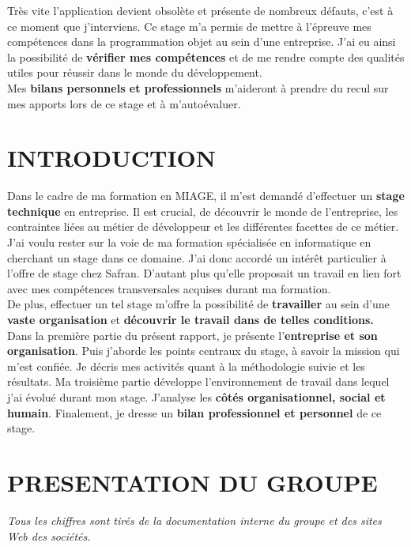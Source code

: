 Très vite l’application devient obsolète et présente de nombreux défauts, c’est à ce moment que j’interviens.
Ce stage m’a permis de mettre à l’épreuve mes compétences dans la programmation objet au sein d’une entreprise. J’ai eu ainsi la possibilité de \textbf {vérifier mes compétences} et de me rendre compte des qualités utiles pour réussir dans le monde du développement. \\

Mes \textbf {bilans personnels et professionnels} m’aideront à prendre du recul sur mes apports lors de ce stage et à m’autoévaluer.\\


\chapter{ INTRODUCTION }


	Dans le cadre de ma formation en MIAGE, il m’est demandé d’effectuer un \textbf{stage technique} en entreprise. Il est crucial, de découvrir le monde de l’entreprise, les contraintes liées au métier de développeur et les différentes facettes de ce métier. J’ai voulu rester sur la voie de ma formation spécialisée en informatique en cherchant un stage dans ce domaine. J’ai donc accordé un intérêt particulier à l’offre de stage chez Safran. D’autant plus qu’elle proposait un travail en lien fort avec mes compétences transversales acquises durant ma formation. \\
    
De plus, effectuer un tel stage m’offre la possibilité de \textbf{travailler} au sein d’une \textbf{vaste organisation} et \textbf{découvrir le travail dans de telles conditions.}\\

Dans la première partie du présent rapport, je présente l’\textbf{entreprise et son organisation}. Puis j’aborde les points centraux du stage, à savoir la mission qui m’est confiée. Je décris mes activités quant à la méthodologie suivie et les résultats. Ma troisième partie développe l’environnement de travail dans lequel j’ai évolué durant mon stage. J’analyse les \textbf{côtés organisationnel, social et humain}. Finalement, je dresse un \textbf{bilan professionnel et personnel} de ce stage.\\


\chapter{ PRESENTATION DU GROUPE }
  \textit{Tous les chiffres sont tirés de la documentation interne du groupe et des sites Web des sociétés.}
  
